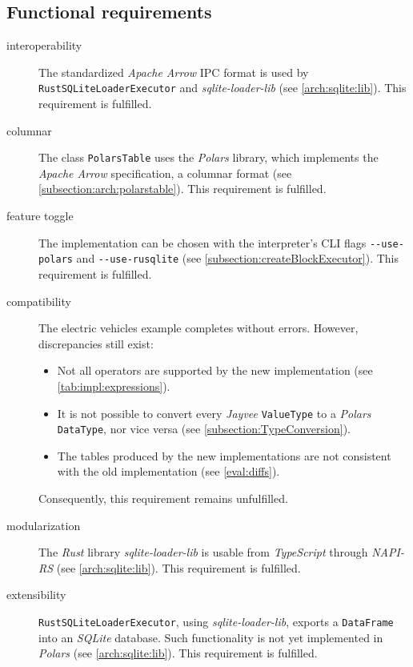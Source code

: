 \subsection{Functional requirements}
\begin{description}
	\item[interoperability] The standardized \emph{Apache Arrow} \ac{IPC} format is used by \Verb|RustSQLiteLoaderExecutor| and \emph{sqlite-loader-lib} (see \autoref{arch:sqlite:lib}).
	      This requirement is fulfilled.
	\item[columnar] The class \Verb|PolarsTable| uses the \emph{Polars} library, which implements the \emph{Apache Arrow} specification, a columnar format (see \autoref{subsection:arch:polarstable}).
	      This requirement is fulfilled.
	\item[feature toggle] The implementation can be chosen with the interpreter's \ac{CLI} flags \Verb|--use-polars| and \Verb|--use-rusqlite| (see \autoref{subsection:createBlockExecutor}).
	      This requirement is fulfilled.
	\item[compatibility] The electric vehicles example completes without errors.
	      However, discrepancies still exist:
	      \begin{itemize}
		      \item Not all operators are supported by the new implementation (see \autoref{tab:impl:expressions}).
		      \item It is not possible to convert every \emph{Jayvee} \Verb|ValueType| to a \emph{Polars} \Verb|DataType|, nor vice versa (see \autoref{subsection:TypeConversion}).
		      \item The tables produced by the new implementations are not consistent with the old implementation (see \autoref{eval:diffs}).
	      \end{itemize}
	      Consequently, this requirement remains unfulfilled.
	\item[modularization] The \emph{Rust} library \emph{sqlite-loader-lib} is usable from \emph{TypeScript} through \emph{NAPI-RS} (see \autoref{arch:sqlite:lib}).
	      This requirement is fulfilled.
	\item[extensibility] \Verb|RustSQLiteLoaderExecutor|, using \emph{sqlite-loader-lib}, exports a \Verb|DataFrame| into an \emph{SQLite} database.
	      Such functionality is not yet implemented in \emph{Polars} (see \autoref{arch:sqlite:lib}).
	      This requirement is fulfilled.
\end{description}

